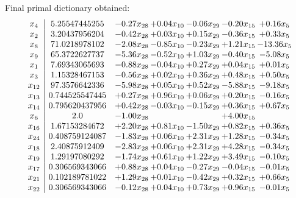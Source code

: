 \documentclass[8pt]{article}
\begin{document}
 Final primal dictionary obtained: 
\[\begin{array}{c| c c@{\hskip 2pt} c@{\hskip 2pt} c@{\hskip 2pt} c@{\hskip 2pt} c@{\hskip 2pt} }
 x_{4}   &  5.25547445255 & -0.27 x_{28} & +  0.04 x_{10} & -0.06 x_{29} & -0.20 x_{15} & +  0.16 x_{5}\\
 x_{2}   &  3.20437956204 & -0.42 x_{28} & +  0.03 x_{10} & +  0.15 x_{29} & -0.36 x_{15} & +  0.33 x_{5}\\
 x_{8}   &  71.0218978102 & -2.08 x_{28} & -0.85 x_{10} & -0.23 x_{29} & +  1.21 x_{15} & -13.36 x_{5}\\
 x_{9}   &  65.3722627737 & -5.36 x_{28} & -0.52 x_{10} & +  1.03 x_{29} & -0.40 x_{15} & -5.08 x_{5}\\
 x_{1}   &  7.69343065693 & -0.88 x_{28} & -0.04 x_{10} & +  0.27 x_{29} & +  0.04 x_{15} & +  0.01 x_{5}\\
 x_{3}   &  1.15328467153 & -0.56 x_{28} & +  0.02 x_{10} & +  0.36 x_{29} & +  0.48 x_{15} & +  0.50 x_{5}\\
 x_{12}   &  97.3576642336 & -5.98 x_{28} & +  0.05 x_{10} & +  0.52 x_{29} & -5.88 x_{15} & -9.18 x_{5}\\
 x_{13}   &  0.744525547445 & +  0.27 x_{28} & +  0.96 x_{10} & +  0.06 x_{29} & +  0.20 x_{15} & -0.16 x_{5}\\
 x_{14}   &  0.795620437956 & +  0.42 x_{28} & -0.03 x_{10} & -0.15 x_{29} & +  0.36 x_{15} & +  0.67 x_{5}\\
 x_{6}   &  2.0 & -1.00 x_{28} &    &   & +  4.00 x_{15} &   \\
 x_{16}   &  1.67153284672 & +  2.20 x_{28} & +  0.81 x_{10} & -1.50 x_{29} & +  0.82 x_{15} & +  0.36 x_{5}\\
 x_{24}   &  0.408759124087 & -1.83 x_{28} & +  0.06 x_{10} & +  2.31 x_{29} & +  1.28 x_{15} & -0.34 x_{5}\\
 x_{18}   &  2.40875912409 & -2.83 x_{28} & +  0.06 x_{10} & +  2.31 x_{29} & +  4.28 x_{15} & -0.34 x_{5}\\
 x_{19}   &  1.29197080292 & -1.74 x_{28} & +  0.61 x_{10} & +  1.22 x_{29} & +  3.49 x_{15} & -0.10 x_{5}\\
 x_{17}   &  0.306569343066 & +  0.88 x_{28} & +  0.04 x_{10} & -0.27 x_{29} & -0.04 x_{15} & -0.01 x_{5}\\
 x_{21}   &  0.102189781022 & +  1.29 x_{28} & +  0.01 x_{10} & -0.42 x_{29} & +  0.32 x_{15} & +  0.66 x_{5}\\
 x_{22}   &  0.306569343066 & -0.12 x_{28} & +  0.04 x_{10} & +  0.73 x_{29} & +  0.96 x_{15} & -0.01 x_{5}\\

\end{array}\]
\end{document}
